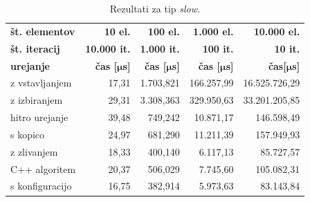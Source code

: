 \documentclass[a4paper,oneside,12pt]{article}
\newcommand{\bmu}{\ensuremath{\boldsymbol{\mu}}}
\newcommand{\usec}{\ensuremath{\bmu}s}
\begin{document}
\begin{table}[h!]
  \centering
  \caption[Rezultati za tip \emph{slow}]{Rezultati za tip \emph{slow.}}
  \label{tab:rez:slow} \vspace{1ex}
  \begin{tabular}{l!{\vrule width 1pt}r|r|r|r}
    \bf št. elementov & \bf 10 el.& \bf 100 el.& \bf 1.000 el. & \bf 10.000 el. \\ 
    \bf št. iteracij  & \bf 10.000 it. & \bf 1.000 it. & \bf 100 it. & \bf 10 it. \\ \hline
    \bf urejanje      & \bf čas [\usec] & \bf čas [\usec] & \bf čas [\usec] & \bf čas[\usec] \\  
    z vstavljanjem    & 17,31 & 1.703,821 & 166.257,99 & 16.525.726,29 \\ \hline
    z izbiranjem      & 29,31 & 3.308,363 & 329.950,63 & 33.201.205,85 \\ \hline
    hitro urejanje    & 39,48 &   749,242 &  10.871,17 &   146.598,49  \\ \hline
    s kopico          & 24,97 &   681,290 &  11.211,39 &   157.949,93  \\ \hline
    z zlivanjem       & 18,33 &   400,140 &   6.117,13 &    85.727,57  \\ \hline
    C++ algoritem     & 20,37 &   506,029 &   7.745,60 &   105.082,31  \\ \hline
    s konfiguracijo   & 16,75 &   382,914 &   5.973,63 &    83.143,84  \\ 
  \end{tabular}
\end{table}
\end{document}
